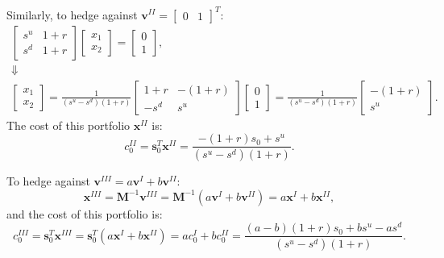 \documentclass[final,3p,times]{elsarticle}
\begin{document}
	Similarly, to hedge against $\mathbf{v}^{II}=\begin{bmatrix} 0 & 1\end{bmatrix}^T$:
	\begin{gather}
		\begin{bmatrix} s^u & 1+r \\ s^d & 1+r \end{bmatrix}
		\begin{bmatrix} x_1 \\ x_2 \end{bmatrix}
		=
		\begin{bmatrix} 0 \\ 1 \end{bmatrix},\nonumber\\
		\Downarrow\nonumber\\
		\begin{bmatrix} x_1 \\ x_2 \end{bmatrix}
		=
		\frac{1}{\left(s^u-s^d\right)\left(1+r\right)}
		\begin{bmatrix} 1+r & -\left(1+r\right) \\ -s^d & s^u \end{bmatrix}
		\begin{bmatrix} 0 \\ 1 \end{bmatrix}
		=
		\frac{1}{\left(s^u-s^d\right)\left(1+r\right)}
		\begin{bmatrix} -\left(1+r\right) \\ s^u \end{bmatrix}
		.
	\end{gather}
	The cost of this portfolio $\mathbf{x}^{II}$ is:
	\begin{equation}
		c_0^{II}=\mathbf{s}_0^T\mathbf{x}^{II}=\frac{-\left(1+r\right)s_0 + s^u}{\left(s^u-s^d\right)\left(1+r\right)}
		.
	\end{equation}
	
	To hedge against $\mathbf{v}^{III}=a\mathbf{v}^{I}+b\mathbf{v}^{II}$:
	\begin{equation}
		\mathbf{x}^{III}
		=\mathbf{M}^{-1}\mathbf{v}^{III}
		=\mathbf{M}^{-1}\left(a\mathbf{v}^{I}+b\mathbf{v}^{II}\right)
		=a\mathbf{x}^{I}+b\mathbf{x}^{II}
		,
	\end{equation}
	and the cost of this portfolio is:
	\begin{equation}
		c_0^{III}
		=\mathbf{s}_0^T\mathbf{x}^{III}
		=\mathbf{s}_0^T\left(a\mathbf{x}^{I}+b\mathbf{x}^{II}\right)
		=ac_0^{I}+bc_0^{II}
		=\frac{\left(a-b\right)\left(1+r\right)s_0 + b s^u - a s^d}{\left(s^u-s^d\right)\left(1+r\right)}
		.
	\end{equation}
	
\end{document}
